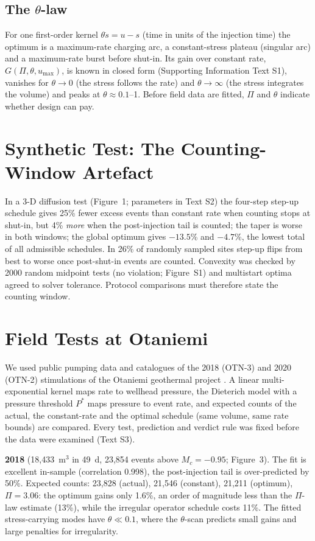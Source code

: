\documentclass[draft]{agujournal2019}
\begin{document}
\subsection{The $\theta$-law}
For one first-order kernel $\theta\dot s=u-s$ (time in units of the injection time) the optimum is a maximum-rate charging arc, a
constant-stress plateau (singular arc) and a maximum-rate burst before shut-in. Its gain over constant rate, $G(\Pi,\theta,u_{\max})$, is
known in closed form (Supporting Information Text S1), vanishes for $\theta\to0$ (the stress follows the rate) and $\theta\to\infty$ (the
stress integrates the volume) and peaks at $\theta\approx0.1$--1. Before field data are fitted, $\Pi$ and $\theta$ indicate whether design
can pay.

\section{Synthetic Test: The Counting-Window Artefact}
In a 3-D diffusion test (Figure~1; parameters in Text S2) the four-step step-up schedule gives 25\% fewer excess events than constant rate
when counting stops at shut-in, but 4\% \emph{more} when the post-injection tail is counted; the taper is worse in both windows; the global
optimum gives $-13.5$\% and $-4.7$\%, the lowest total of all admissible schedules. In 26\% of randomly sampled sites step-up flips from best
to worse once post-shut-in events are counted. Convexity was checked by 2000 random midpoint tests (no violation; Figure~S1) and multistart
optima agreed to solver tolerance. Protocol comparisons must therefore state the counting window.

\section{Field Tests at Otaniemi}
We used public pumping data \cite{Kukkonen2023} and catalogues \cite{Leonhardt2021,Kwiatek2022data} of the 2018 (OTN-3) and 2020 (OTN-2)
stimulations of the Otaniemi geothermal project \cite{Kwiatek2019,Kwiatek2022}. A linear multi-exponential kernel maps rate to wellhead
pressure, the Dieterich model with a pressure threshold $P^*$ maps pressure to event rate, and expected counts of the actual, the
constant-rate and the optimal schedule (same volume, same rate bounds) are compared. Every test, prediction and verdict rule was fixed before
the data were examined (Text S3).

\textbf{2018} (18,433~m$^3$ in 49~d, 23,854 events above $M_c=-0.95$; Figure~3). The fit is excellent in-sample (correlation 0.998), the
post-injection tail is over-predicted by 50\%. Expected counts: 23,828 (actual), 21,546 (constant), 21,211 (optimum), $\Pi=3.06$: the
optimum gains only 1.6\%, an order of magnitude less than the $\Pi$-law estimate (13\%), while the irregular operator schedule costs 11\%.
The fitted stress-carrying modes have $\theta\ll0.1$, where the $\theta$-scan predicts small gains and large penalties for irregularity.
\end{document}
